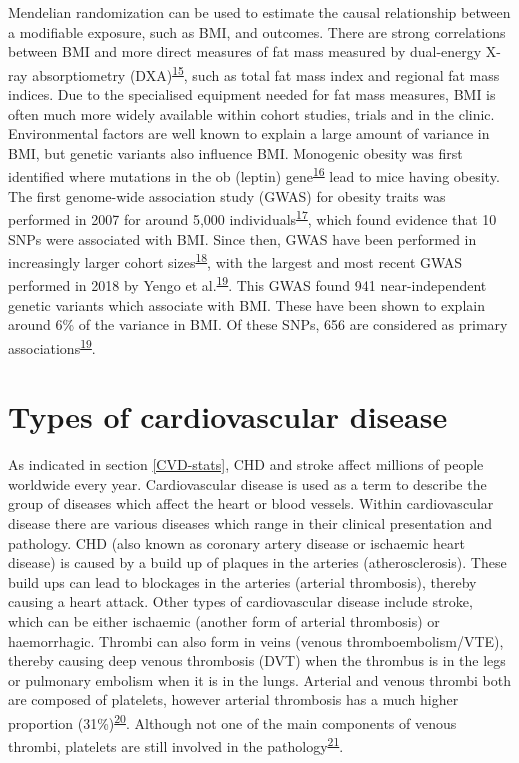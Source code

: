 \documentclass[11pt,twoside]{bristolthesis}
\begin{document}
Mendelian randomization can be used to estimate the causal relationship between a modifiable exposure, such as BMI, and outcomes. There are strong correlations between BMI and more direct measures of fat mass measured by dual-energy X-ray absorptiometry (DXA)\textsuperscript{\protect\hyperlink{ref-Bell2018}{15}}, such as total fat mass index and regional fat mass indices. Due to the specialised equipment needed for fat mass measures, BMI is often much more widely available within cohort studies, trials and in the clinic. Environmental factors are well known to explain a large amount of variance in BMI, but genetic variants also influence BMI. Monogenic obesity was first identified where mutations in the ob (leptin) gene\textsuperscript{\protect\hyperlink{ref-Zhang1994}{16}} lead to mice having obesity. The first genome-wide association study (GWAS) for obesity traits was performed in 2007 for around 5,000 individuals\textsuperscript{\protect\hyperlink{ref-Scuteri2007}{17}}, which found evidence that 10 SNPs were associated with BMI. Since then, GWAS have been performed in increasingly larger cohort sizes\textsuperscript{\protect\hyperlink{ref-Locke2015}{18}}, with the largest and most recent GWAS performed in 2018 by Yengo et al.\textsuperscript{\protect\hyperlink{ref-Yengo2018}{19}}. This GWAS found 941 near-independent genetic variants which associate with BMI. These have been shown to explain around 6\% of the variance in BMI. Of these SNPs, 656 are considered as primary associations\textsuperscript{\protect\hyperlink{ref-Yengo2018}{19}}.

\hypertarget{types-of-cardiovascular-disease}{%
\section{Types of cardiovascular disease}\label{types-of-cardiovascular-disease}}

As indicated in section \ref{CVD-stats}, CHD and stroke affect millions of people worldwide every year. Cardiovascular disease is used as a term to describe the group of diseases which affect the heart or blood vessels. Within cardiovascular disease there are various diseases which range in their clinical presentation and pathology. CHD (also known as coronary artery disease or ischaemic heart disease) is caused by a build up of plaques in the arteries (atherosclerosis). These build ups can lead to blockages in the arteries (arterial thrombosis), thereby causing a heart attack. Other types of cardiovascular disease include stroke, which can be either ischaemic (another form of arterial thrombosis) or haemorrhagic. Thrombi can also form in veins (venous thromboembolism/VTE), thereby causing deep venous thrombosis (DVT) when the thrombus is in the legs or pulmonary embolism when it is in the lungs. Arterial and venous thrombi both are composed of platelets, however arterial thrombosis has a much higher proportion (31\%)\textsuperscript{\protect\hyperlink{ref-Chernysh2020}{20}}. Although not one of the main components of venous thrombi, platelets are still involved in the pathology\textsuperscript{\protect\hyperlink{ref-Koupenova2017a}{21}}.
\end{document}
